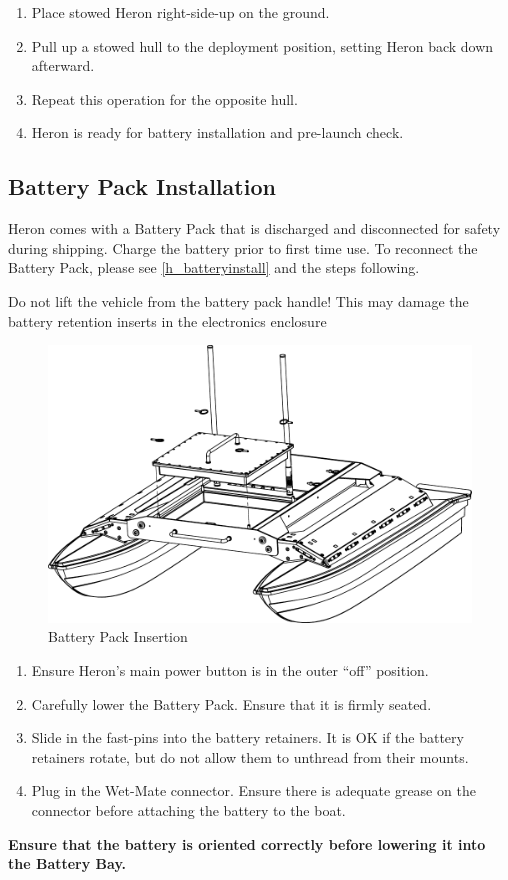 \documentclass[]{clearpath-latex/clearpath-manual}
\begin{document}
\begin{enumerate}[nolistsep]
	\item Place stowed Heron right-side-up on the ground.
	\item Pull up a stowed hull to the deployment position, setting Heron back down afterward.
	\item Repeat this operation for the opposite hull.
	\item Heron is ready for battery installation and pre-launch check.
\end{enumerate}
\newpage

\subsection{Battery Pack Installation}
Heron comes with a Battery Pack that is discharged and disconnected for safety during shipping. Charge the battery prior to first time use.
To reconnect the Battery Pack, please see \autoref{h_batteryinstall} and the steps following.

\begin{warning}
Do not lift the vehicle from the battery pack handle! This may damage the battery retention inserts in the electronics enclosure
\end{warning}

\begin{figure}[h]
  \centering
  \includegraphics[width=0.75\linewidth]{graphics/h-battery.pdf}
  \caption{Battery Pack Insertion}
  \label{h_batteryinstall}
\end{figure}

\begin{enumerate}[nolistsep]
	\item Ensure Heron's main power button is in the outer “off” position.
	\item Carefully lower the Battery Pack. Ensure that it is firmly seated.
	\item Slide in the fast-pins into the battery retainers. It is OK if the battery retainers rotate, but do not allow them to unthread from their mounts. 
	\item Plug in the Wet-Mate connector. Ensure there is adequate grease on the connector before attaching the battery to the boat.
\end{enumerate}
\textbf{Ensure that the battery is oriented correctly before lowering it into the Battery Bay.}
\end{document}
